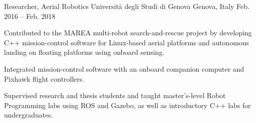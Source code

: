 \begin{cventries}
  \cventry
  {Researcher, Aerial Robotics}
  {Università degli Studi di Genova}
  {Genova, Italy}
  {Feb. 2016 -- Feb. 2018}
  {
    \begin{cvitems}
    \item {Contributed to the MAREA multi-robot search-and-rescue project by developing C++ mission-control software for Linux-based aerial platforms and autonomous landing on floating platforms using onboard sensing.}
    \item {Integrated mission-control software with an onboard companion computer and Pixhawk flight controllers.}
    \item {Supervised research and thesis students and taught master's-level Robot Programming labs using ROS and Gazebo, as well as introductory C++ labs for undergraduates.}
    \end{cvitems}
  }

\end{cventries}